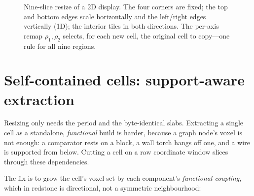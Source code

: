 \documentclass[11pt]{article}
\begin{document}
\begin{figure}[ht]
\centering
{}
\caption{Nine-slice resize of a 2D display. The four corners are fixed; the top
and bottom edges scale horizontally and the left/right edges vertically (1D); the
interior tiles in both directions. The per-axis remap $\rho_1,\rho_2$ selects, for
each new cell, the original cell to copy---one rule for all nine regions.}
\label{fig:nineslice}
\end{figure}

\section{Self-contained cells: support-aware extraction}\label{sec:support}

Resizing only needs the period and the byte-identical slabs. Extracting a single
cell as a standalone, \emph{functional} build is harder, because a graph node's
voxel is not enough: a comparator rests on a block, a wall torch hangs off one,
and a wire is supported from below. Cutting a cell on a raw coordinate window
slices through these dependencies.

The fix is to grow the cell's voxel set by each component's \emph{functional
coupling}, which in redstone is directional, not a symmetric neighbourhood:
\end{document}
